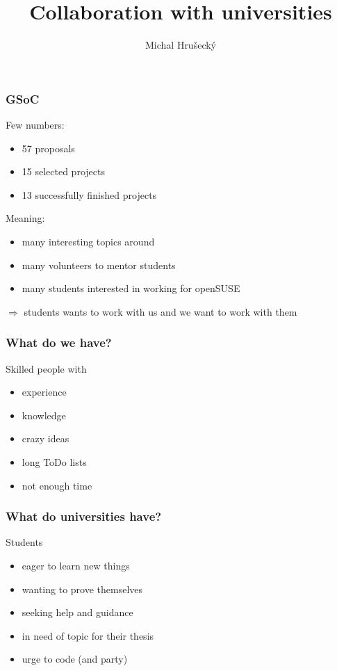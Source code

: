 \documentclass{beamer}
\author{Michal Hru\v{s}eck\'{y}\newline {\small openSUSE Boosters}}
\title{Collaboration with universities}
\begin{document}
\begin{frame}[t,plain]
\titlepage
\end{frame}

\begin{frame}[t]
\frametitle{GSoC}
Few numbers:
\begin{itemize}
	\item 57 proposals
	\item 15 selected projects
	\item 13 successfully finished projects
\end{itemize}

\pause
\vspace{0.5cm}
Meaning:
\begin{itemize}
	\item many interesting topics around
	\item many volunteers to mentor students
	\item many students interested in working for openSUSE
\end{itemize}

{\(\Rightarrow\) students wants to work with us and we want to work with them}

\end{frame}

\begin{frame}[t]
\frametitle{What do we have?}
Skilled people with
\begin{itemize}
	\item experience
	\item knowledge
	\item crazy ideas
	\item long ToDo lists
	\item not enough time
\end{itemize}
\end{frame}

\begin{frame}[t]
\frametitle{What do universities have?}
Students
\begin{itemize}
	\item eager to learn new things
	\item wanting to prove themselves
	\item seeking help and guidance
	\item in need of topic for their thesis
	\item urge to code {\scriptsize (and party)}
\end{itemize}
\end{frame}
\end{document}
